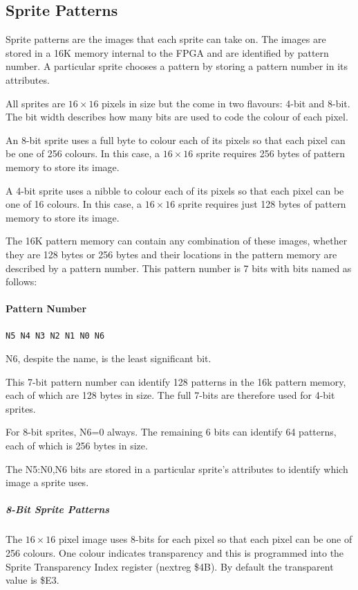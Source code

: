 \subsection{Sprite Patterns}
Sprite patterns are the images that each sprite can take on. The
images are stored in a 16K memory internal to the FPGA and are
identified by pattern number. A particular sprite chooses a pattern by
storing a pattern number in its attributes.

All sprites are $16\times16$ pixels in size but the come in two
flavours: 4-bit and 8-bit. The bit width describes how many bits are
used to code the colour of each pixel.

An 8-bit sprite uses a full byte to colour each of its pixels so that
each pixel can be one of 256 colours. In this case, a $16\times16$
sprite requires 256 bytes of pattern memory to store its image.

A 4-bit sprite uses a nibble to colour each of its pixels so that each
pixel can be one of 16 colours. In this case, a $16\times16$ sprite
requires just 128 bytes of pattern memory to store its image.

The 16K pattern memory can contain any combination of these images,
whether they are 128 bytes or 256 bytes and their locations in the
pattern memory are described by a pattern number. This pattern number
is 7 bits with bits named as follows:

\paragraph{Pattern Number}
\begin{verbatim}
N5 N4 N3 N2 N1 N0 N6
\end{verbatim}
N6, despite the name, is the least significant bit.

This 7-bit pattern number can identify 128 patterns in the 16k pattern
memory, each of which are 128 bytes in size. The full 7-bits are
therefore used for 4-bit sprites.

For 8-bit sprites, N6=0 always. The remaining 6 bits can identify 64
patterns, each of which is 256 bytes in size.

The N5:N0,N6 bits are stored in a particular sprite’s attributes to
identify which image a sprite uses.

\subparagraph{8-Bit Sprite Patterns}

The $16\times16$ pixel image uses 8-bits for each pixel so that each
pixel can be one of 256 colours. One colour indicates transparency and
this is programmed into the Sprite Transparency Index register
(nextreg \$4B). By default the transparent value is \$E3.

